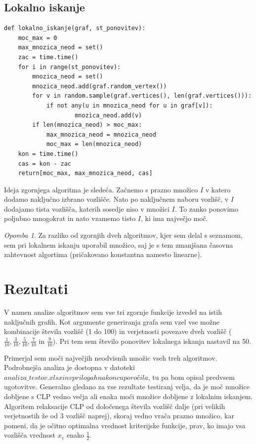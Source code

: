 \documentclass[a4paper, 12 pt]{article}
\theoremstyle{definition}
\theoremstyle{plain}
\theoremstyle{remark}
\newtheorem*{opomba}{Opomba}
\begin{document}
\subsection{Lokalno iskanje} \label{lokiskalgorit}
\begin{verbatim}
def lokalno_iskanje(graf, st_ponovitev):
    moc_max = 0 
    max_mnozica_neod = set() 
    zac = time.time()
    for i in range(st_ponovitev):
        mnozica_neod = set() 
        mnozica_neod.add(graf.random_vertex()) 
        for v in random.sample(graf.vertices(), len(graf.vertices())):
            if not any(u in mnozica_neod for u in graf[v]): 
                    mnozica_neod.add(v)
        if len(mnozica_neod) > moc_max: 
            max_mnozica_neod = mnozica_neod
            moc_max = len(mnozica_neod)
    kon = time.time()
    cas = kon - zac
    return[moc_max, max_mnozica_neod, cas]
\end{verbatim}

Ideja zgornjega algoritma je sledeča. Začnemo s prazno množico $I$ v katero dodamo naključno izbrano vozlišče. Nato po naključnem naboru vozlišč, v  $I$ dodajamo tista vozlišča, katerih sosedje niso v množici  $I$. To zanko ponovimo poljubno mnogokrat in nato vzamemo tisto  $I$, ki ima največjo moč.


\begin{opomba}
Za razliko od zgornjih dveh algoritmov, kjer sem delal s seznamom, sem pri lokalnem iskanju uporabil množico, saj je s tem zmanjšana časovna zahtevnost algortima (pričakovano konstantna namesto linearne).
\end{opomba}
\newpage
\section{Rezultati} %
V namen analize algoritmov sem vse tri zgornje funkcije izvedel na istih naključnih grafih. Kot argumente generiranja grafa sem vzel vse možne kombinacije števila vozlišč (1 do 100) in verjetnosti povezave dveh vozlišč ($\frac{1}{10}, \frac{3}{10}, \frac{5}{10}, \frac{7}{10}$ in $\frac{9}{10}$). Pri tem sem število ponovitev lokalnega iskanja nastavil na 50.

Primerjal sem moči največjih neodvisnih množic vseh treh algoritmov. Podrobnejša analiza je dostopna v datoteki $\textit{analiza\_testov.xlsx} in v prilogah na koncu poročila$, tu pa bom opisal predvsem ugotovitve.  Generalno gledano za vse rezultate testiranj velja, da je moč množice dobljene s CLP vedno večja ali enaka moči množice dobljene z lokalnim iskanjem. Algoritem relaksacije CLP od določenega števila vozlišč dalje (pri velikih verjetnostih že od 3 vozlišč naprej), skoraj vedno vrača prazno množico, kar pomeni, da je očitno optimalna vrednost kriterijske funkcije, prav, ko imajo vsa vozlišča vrednost $x_v$ enako $\frac{1}{2}$.
\end{document}
